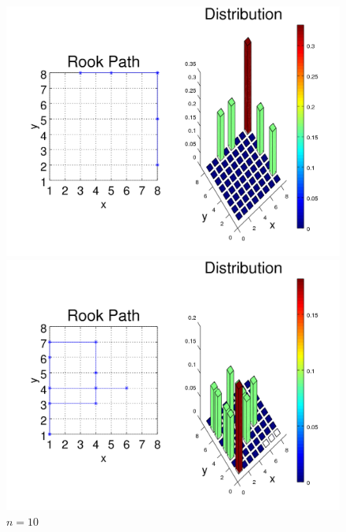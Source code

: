 \documentclass{amsart}
\numberwithin{equation}{section}
\begin{document}
\begin{figure}[!h]
\begin{minipage}{0.50\textwidth}
     \captionsetup*{labelformat=empty}
     \caption{$n=5$}
   \end{minipage}\hfil
   \begin{minipage}{0.50\textwidth}
     \centering
     \includegraphics[width=1.0\linewidth]{figures/regular/figure_Rook_path_n5_x8_y8.png}
     \captionsetup{labelformat=empty}
     \caption*{$n=5$}
    \end{minipage}\hfil
    \begin{minipage}{0.50\textwidth}
     \centering
     \includegraphics[width=1.0\linewidth]{figures/regular/figure_Rook_path_n10_x1_y1.png}
     \captionsetup{labelformat=empty}
     \caption*{$n=10$}
   \end{minipage}\hfil

\end{figure}
\end{document}
